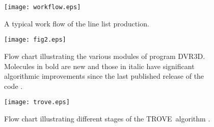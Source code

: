 \documentclass[12pt]{article}
\newcommand{\trove}{{\sc TROVE}}
\newcommand{\2}{$_{2}$}
\newcommand{\3}{$_{3}$}
\newcommand{\4}{$_{4}$}
\begin{document}
\clearpage

\begin{figure}
\texttt{[image: workflow.eps]}
\caption{\label{f:workflow} A typical work flow of the line list production.  }
\end{figure}

\begin{figure}
\centering
\texttt{[image: fig2.eps]}
\caption{\label{f:dvr3d} Flow chart illustrating the various modules of program
{\sc DVR3D}. Molecules in bold are new and those in italic have significant
algorithmic improvements since the last published release of the code \cite{DVR3D}.}
\end{figure}


\begin{figure}
\centering
\texttt{[image: trove.eps]}
\caption{\label{f:trove} Flow chart illustrating different stages of the \trove\ algorithm \cite{DVR3D,TROVE,15YaYuxx.method}.}
\end{figure}
\end{document}
